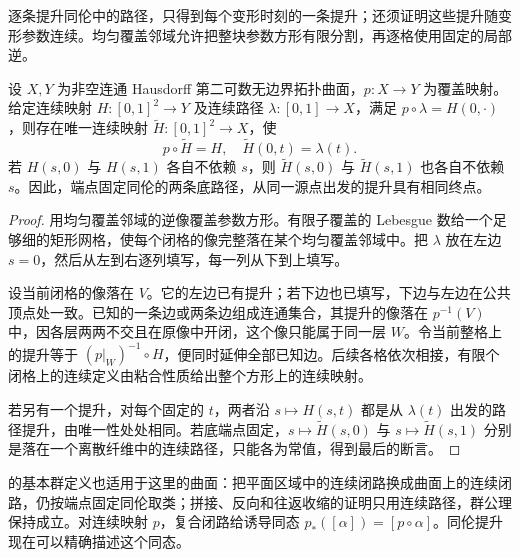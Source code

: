 逐条提升同伦中的路径，只得到每个变形时刻的一条提升；还须证明这些提升随变形参数连续。均匀覆盖邻域允许把整块参数方形有限分割，再逐格使用固定的局部逆。

\begin{theorem}[同伦提升]\label{b3:thm:11-homotopy-lifting}
设 \(X,Y\) 为非空连通 Hausdorff 第二可数无边界拓扑曲面，\(p:X\to Y\) 为覆盖映射。给定连续映射 \(H:[0,1]^2\to Y\) 及连续路径 \(\lambda:[0,1]\to X\)，满足 \(p\circ\lambda=H(0,\cdot)\)，则存在唯一连续映射 \(\widetilde H:[0,1]^2\to X\)，使
\[
 p\circ\widetilde H=H,
 \quad \widetilde H(0,t)=\lambda(t).
\]
若 \(H(s,0)\) 与 \(H(s,1)\) 各自不依赖 \(s\)，则 \(\widetilde H(s,0)\) 与 \(\widetilde H(s,1)\) 也各自不依赖 \(s\)。因此，端点固定同伦的两条底路径，从同一源点出发的提升具有相同终点。
\end{theorem}
\begin{proof}
用均匀覆盖邻域的逆像覆盖参数方形。有限子覆盖的 Lebesgue 数给一个足够细的矩形网格，使每个闭格的像完整落在某个均匀覆盖邻域中。把 \(\lambda\) 放在左边 \(s=0\)，然后从左到右逐列填写，每一列从下到上填写。

设当前闭格的像落在 \(V\)。它的左边已有提升；若下边也已填写，下边与左边在公共顶点处一致。已知的一条边或两条边组成连通集合，其提升的像落在 \(p^{-1}(V)\) 中，因各层两两不交且在原像中开闭，这个像只能属于同一层 \(W\)。令当前整格上的提升等于 \((p|_W)^{-1}\circ H\)，便同时延伸全部已知边。后续各格依次相接，有限个闭格上的连续定义由粘合性质给出整个方形上的连续映射。

若另有一个提升，对每个固定的 \(t\)，两者沿 \(s\mapsto H(s,t)\) 都是从 \(\lambda(t)\) 出发的路径提升，由唯一性处处相同。若底端点固定，\(s\mapsto\widetilde H(s,0)\) 与 \(s\mapsto\widetilde H(s,1)\) 分别是落在一个离散纤维中的连续路径，只能各为常值，得到最后的断言。
\end{proof}
的基本群定义也适用于这里的曲面：把平面区域中的连续闭路换成曲面上的连续闭路，仍按端点固定同伦取类；拼接、反向和往返收缩的证明只用连续路径，群公理保持成立。对连续映射 \(p\)，复合闭路给诱导同态 \(p_*([\alpha])=[p\circ\alpha]\)。同伦提升现在可以精确描述这个同态。

